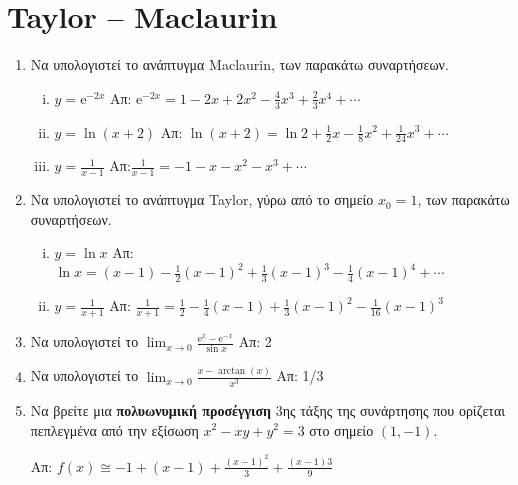 \section*{Taylor -- Maclaurin}

\begin{enumerate}
  \item Να υπολογιστεί το ανάπτυγμα Maclaurin, των παρακάτω συναρτήσεων.
    \begin{enumerate}[i)]
      \item $ y= \mathrm{e}^{-2x} $ 
        \hfill Απ: $\mathrm{e}^{-2x} = 1-2x+ 2x^{2} - \frac{4}{3} x^{3} +
        \frac{2}{3} x^{4} + \cdots $ 
      \item $ y= \ln{(x+2)} $ 
        \hfill Απ: $ \ln{(x+2)} = \ln{2} + \frac{1}{2} x - \frac{1}{8} x^{2} +
        \frac{1}{24} x^{3} + \cdots $ 
      \item $ y= \frac{1}{x-1} $ \hfill Απ:$\frac{1}{x-1} = -1 -x -x^{2} - x^{3} +
        \cdots $ 
    \end{enumerate}

  \item Να υπολογιστεί το ανάπτυγμα Taylor, γύρω από το σημείο $ x_{0}=1 $, 
    των παρακάτω συναρτήσεων.
    \begin{enumerate}[i)]
      \item $ y= \ln{x} $ 
        \hfill Απ: $ \ln{x} = (x-1) - \frac{1}{2} (x-1)^{2} + \frac{1}{3} (x-1)^{3} - 
        \frac{1}{4} (x-1)^4 + \cdots $ 
      \item $ y= \frac{1}{x+1} $ \hfill Απ: $ \frac{1}{x+1} = \frac{1}{2} -
        \frac{1}{4} (x-1) + \frac{1}{3} (x-1)^{2} - \frac{1}{16} (x-1)^{3} $ 
    \end{enumerate}


  \item Να υπολογιστεί το $ \lim_{x \to 0} \frac{\mathrm{e}^{x} -
    \mathrm{e}^{-x}}{\sin{x}} $ \hfill Απ: 2 

  \item Να υπολογιστεί το $ \lim_{x \to 0} \frac{x - \arctan(x)}{x^{3}} $ \hfill Απ: 1/3 

  \item Να βρείτε μια \textbf{πολυωνυμική προσέγγιση} 3ης τάξης 
    της συνάρτησης που ορίζεται πεπλεγμένα από την εξίσωση 
    $ x^{2} - xy + y^{2} = 3$ στο σημείο $ (1,-1) $.

    \hfill Απ: $f(x) \cong -1 + (x-1) + \frac{(x-1)^{2}}{3} +
    \frac{(x-1){3}}{9}$
\end{enumerate}


